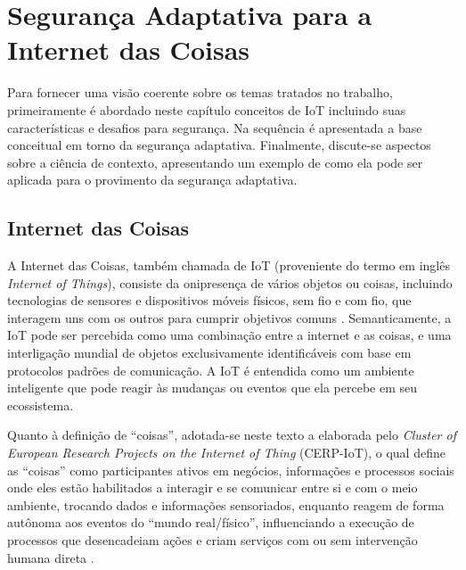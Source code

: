 \documentclass[tid,table]{texufpel} %
\begin{document}
\chapter{Segurança Adaptativa para a Internet das Coisas}

Para fornecer uma visão coerente sobre os temas tratados no trabalho, primeiramente é abordado neste capítulo conceitos de IoT incluindo suas características e desafios para segurança. Na sequência é apresentada a base conceitual em torno da segurança adaptativa. Finalmente, discute-se aspectos sobre a ciência de contexto, apresentando um exemplo de como ela pode ser aplicada para o provimento da segurança adaptativa.

\section{Internet das Coisas}

A Internet das Coisas, também chamada de IoT (proveniente do termo em inglês \textit{Internet of Things}), consiste da onipresença de vários objetos ou coisas, incluindo tecnologias de sensores e dispositivos móveis físicos, sem fio e com fio, que interagem uns com os outros para cumprir objetivos comuns \cite{giusto10}. Semanticamente, a IoT pode ser percebida como uma combinação entre a internet e as coisas, e uma interligação mundial de objetos exclusivamente identificáveis com base em protocolos padrões de comunicação. A IoT é entendida como um ambiente inteligente que pode reagir às mudanças ou eventos que ela percebe em seu ecossistema. 

Quanto à definição de ``coisas'', adotada-se neste texto a elaborada pelo \textit{Cluster of European Research Projects on the Internet of Thing} (CERP-IoT), o qual define as ``coisas'' como participantes ativos em negócios, informações e processos sociais onde eles estão habilitados a interagir e se comunicar entre si e com o meio ambiente, trocando dados e informações sensoriados, enquanto reagem de forma autônoma aos eventos do ``mundo real/físico'', influenciando a execução de processos que desencadeiam ações e criam serviços com ou sem intervenção humana direta \cite{sundmaeker10}. 
\end{document}
